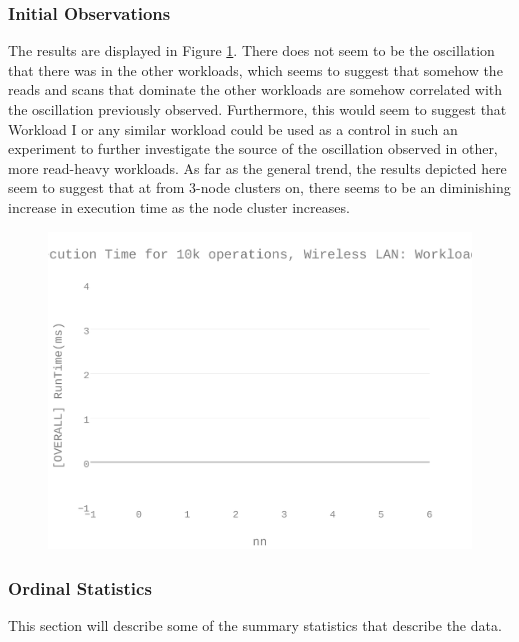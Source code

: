 \subsubsection{Initial Observations}
The results are displayed in Figure \ref{figures-wli_fig8}.  There does not seem to be the oscillation that there was in the other workloads, which seems to suggest that somehow the reads and scans that dominate the other workloads are somehow correlated with the oscillation previously observed. Furthermore, this would seem to suggest that Workload I or any similar workload could be used as a control in such an experiment to further investigate the source of the oscillation observed in other, more read-heavy workloads.   As far as the general trend, the results depicted here seem to suggest that at from 3-node clusters on, there seems to be an diminishing increase in execution time as the node cluster increases.  \begin{figure}[h]
\includegraphics[width=5.5in]{Figures/figures-wli_fig8.pdf}
\caption{}
\label{figures-wli_fig8}
\end{figure}



\subsubsection{Ordinal Statistics}
This section will describe some of the summary statistics that describe the data.  


